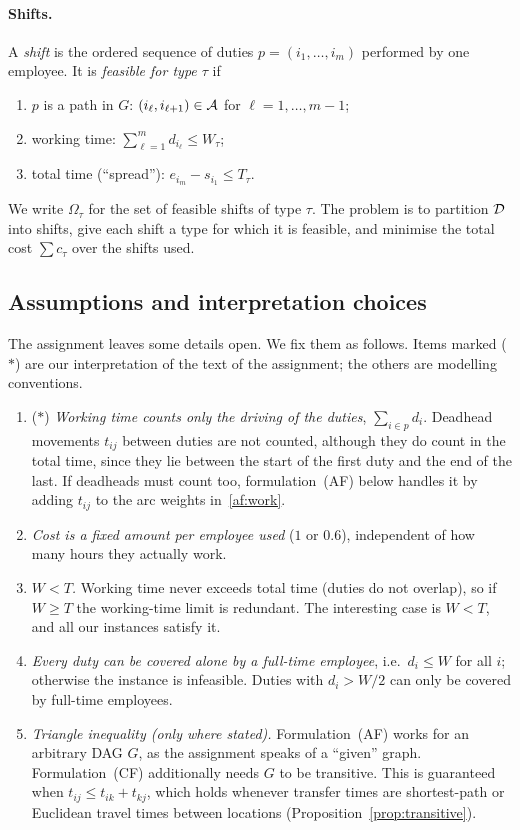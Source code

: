 \paragraph{Shifts.}
A \emph{shift} is the ordered sequence of duties $p=(i_1,\dots,i_m)$
performed by one employee. It is \emph{feasible for type $\tau$} if
\begin{enumerate}[label=(S\arabic*)]
  \item $p$ is a path in $G$: $(i_\ell,i_{\ell+1})\in\mathcal{A}$ for
        $\ell=1,\dots,m-1$;
  \item working time: $\sum_{\ell=1}^m d_{i_\ell}\le W_\tau$;
  \item total time (``spread''): $e_{i_m}-s_{i_1}\le T_\tau$.
\end{enumerate}
We write $\Omega_\tau$ for the set of feasible shifts of type $\tau$. The
problem is to partition $\mathcal{D}$ into shifts, give each shift a type for which it
is feasible, and minimise the total cost $\sum c_\tau$ over the shifts used.

\subsection{Assumptions and interpretation choices}
\label{sec:assumptions}

The assignment leaves some details open. We fix them as follows. Items
marked ($\ast$) are our interpretation of the text of the assignment; the
others are modelling conventions.

\begin{enumerate}[label=(A\arabic*)]
  \item\label{ass:work} ($\ast$) \emph{Working time counts only the driving
    of the duties}, $\sum_{i\in p}d_i$. Deadhead movements $t_{ij}$ between
    duties are not counted, although they do count in the total time, since
    they lie between the start of the first duty and the end of the last.
    If deadheads must count too, formulation~(AF) below handles it by adding
    $t_{ij}$ to the arc weights in~\eqref{af:work}.
  \item\label{ass:cost} \emph{Cost is a fixed amount per employee used}
    ($1$ or $0.6$), independent of how many hours they actually work.
  \item\label{ass:wt} \emph{$W<T$.} Working time never exceeds total time
    (duties do not overlap), so if $W\ge T$ the working-time limit is redundant.
    The interesting case is $W<T$, and all our instances satisfy it.
  \item\label{ass:single} \emph{Every duty can be covered alone by a full-time
    employee}, i.e.\ $d_i\le W$ for all $i$; otherwise the instance is
    infeasible. Duties with $d_i>W/2$ can only be covered by full-time
    employees.
  \item\label{ass:tri} \emph{Triangle inequality (only where stated).}
    Formulation~(AF) works for an arbitrary DAG $G$, as the assignment speaks
    of a ``given'' graph. Formulation~(CF) additionally needs $G$ to be
    transitive. This is guaranteed when
    $t_{ij}\le t_{ik}+t_{kj}$, which holds whenever transfer times are
    shortest-path or Euclidean travel times between locations
    (Proposition~\ref{prop:transitive}).
\end{enumerate}

